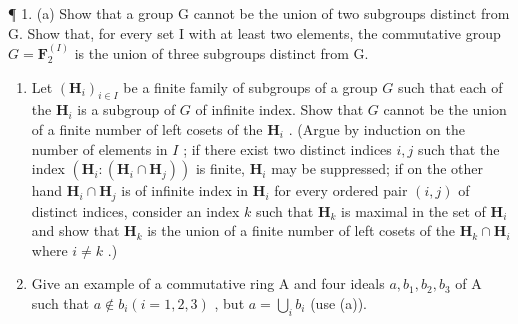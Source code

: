 
¶ 1. (a) Show that a group G cannot be the union of two subgroups distinct from G. Show that, for every set I with at least two elements, the commutative group \(G = \mathbf{F}_{2}^{(I)}\) is the union of three subgroups distinct from G.

\begin{enumerate}
\def\labelenumi{(\alph{enumi})}
\setcounter{enumi}{1}
\item
  Let \((\mathbf{H}_i)_{i\in I}\) be a finite family of subgroups of a group \(G\) such that each of the \(\mathbf{H}_i\) is a subgroup of \(G\) of infinite index. Show that \(G\) cannot be the union of a finite number of left cosets of the \(\mathbf{H}_i\) . (Argue by induction on the number of elements in \(I\) ; if there exist two distinct indices \(i,j\) such that the index \((\mathbf{H}_i:(\mathbf{H}_i\cap \mathbf{H}_j))\) is finite, \(\mathbf{H}_i\) may be suppressed; if on the other hand \(\mathbf{H}_i\cap \mathbf{H}_j\) is of infinite index in \(\mathbf{H}_i\) for every ordered pair \((i,j)\) of distinct indices, consider an index \(k\) such that \(\mathbf{H}_k\) is maximal in the set of \(\mathbf{H}_i\) and show that \(\mathbf{H}_k\) is the union of a finite number of left cosets of the \(\mathbf{H}_k\cap \mathbf{H}_i\) where \(i\neq k\) .)
\item
  Give an example of a commutative ring A and four ideals \(a, b_{1}, b_{2}, b_{3}\) of A such that \(a \notin b_{i} (i = 1, 2, 3)\) , but \(a = \bigcup_{i} b_{i}\) (use (a)).
\end{enumerate}

